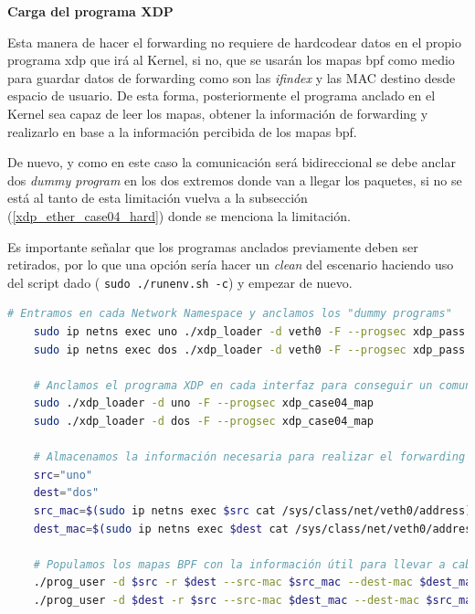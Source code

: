 \vspace{1cm}
\textbf{Carga del programa XDP}\\
\par
Esta manera de hacer el forwarding no requiere de hardcodear datos en el propio programa \gls{xdp} que irá al Kernel, si no, que se usarán los mapas \gls{bpf} como medio para guardar datos de forwarding como son las \textit{ifindex} y las MAC destino desde espacio de usuario. De esta forma, posteriormente el programa anclado en el Kernel sea capaz de leer los mapas, obtener la información de forwarding y realizarlo en base a la información percibida de los mapas \gls{bpf}.\\
\par

De nuevo, y como en este caso la comunicación será bidireccional se debe anclar dos \textit{dummy program} en los dos extremos donde van a llegar los paquetes, si no se está al tanto de esta limitación vuelva a la subsección (\ref{xdp_ether_case04_hard}) donde se menciona la limitación.\\
\par

Es importante señalar que los programas anclados previamente deben ser retirados, por lo que una opción sería hacer un \textit{clean} del escenario haciendo uso del script dado ( \texttt{sudo ./runenv.sh -c}) y empezar de nuevo.\\
\par
\begin{lstlisting}[language= bash, style=Consola, caption={Carga del programa XDP Semi-Hardcoded forwarding - Case04},label=code:case04_xdp_ether_load2]
    # Entramos en cada Network Namespace y anclamos los "dummy programs"
    sudo ip netns exec uno ./xdp_loader -d veth0 -F --progsec xdp_pass
    sudo ip netns exec dos ./xdp_loader -d veth0 -F --progsec xdp_pass
    
    # Anclamos el programa XDP en cada interfaz para conseguir un comunicación bidireccional 
    sudo ./xdp_loader -d uno -F --progsec xdp_case04_map
    sudo ./xdp_loader -d dos -F --progsec xdp_case04_map
    
    # Almacenamos la información necesaria para realizar el forwarding 
    src="uno"
    dest="dos"
    src_mac=$(sudo ip netns exec $src cat /sys/class/net/veth0/address)
    dest_mac=$(sudo ip netns exec $dest cat /sys/class/net/veth0/address)
     
    # Populamos los mapas BPF con la información útil para llevar a cabo el forwarding en ambas direcciones
    ./prog_user -d $src -r $dest --src-mac $src_mac --dest-mac $dest_mac
    ./prog_user -d $dest -r $src --src-mac $dest_mac --dest-mac $src_mac
\end{lstlisting}


